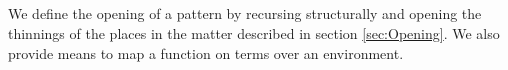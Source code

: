 \begin{code}%
\>[0]\AgdaSpace{}%
\AgdaSpace{}%
\AgdaSymbol{\{}\AgdaSpace{}%
\AgdaSymbol{:}\AgdaSpace{}%
\AgdaSymbol{\}}\AgdaSpace{}%
\AgdaSymbol{:}\AgdaSpace{}%
\AgdaSpace{}%
\AgdaSpace{}%
\AgdaSpace{}%
\AgdaSpace{}%
\<%
\\
\>[0][@{}l@{\AgdaIndent{0}}]%
\>[2]%
\>[9]\AgdaSymbol{:}\AgdaSpace{}%
\AgdaSymbol{\{}\AgdaSpace{}%
\AgdaSymbol{:}\AgdaSpace{}%
\AgdaSymbol{\}}\AgdaSpace{}%
\AgdaSpace{}%
\AgdaSymbol{(}\AgdaSpace{}%
\AgdaSymbol{)}\AgdaSpace{}%
\<%
\\
%
\>[2]%
\>[9]\AgdaSymbol{:}\AgdaSpace{}%
\AgdaSpace{}%
\AgdaSpace{}%
\AgdaSpace{}%
\AgdaSpace{}%
\AgdaSpace{}%
\AgdaSpace{}%
\AgdaSymbol{(}\AgdaSpace{}%
\AgdaSpace{}%
\AgdaSymbol{)}\AgdaSpace{}%
\<%
\\
%
\>[2]%
\>[9]\AgdaSymbol{:}\AgdaSpace{}%
\AgdaSpace{}%
\AgdaSpace{}%
\AgdaSpace{}%
\AgdaSymbol{(}\AgdaSpace{}%
\AgdaSymbol{)}\AgdaSpace{}%
\<%
\\
%
\>[2]%
\>[9]\AgdaSymbol{:}\AgdaSpace{}%
\AgdaSymbol{\{}\AgdaSpace{}%
\AgdaSymbol{:}\AgdaSpace{}%
\AgdaSpace{}%
\AgdaSpace{}%
\AgdaSymbol{\}}\AgdaSpace{}%
\AgdaSpace{}%
\AgdaSpace{}%
\AgdaSpace{}%
\AgdaSpace{}%
\AgdaSymbol{(}\AgdaSpace{}%
\AgdaSymbol{)}\AgdaSpace{}%
\<%
\end{code}

We define the opening of a pattern by recursing structurally and opening
the thinnings of the places in the matter described in section \ref{sec:Opening}.
We also provide means to map a function on terms over an environment.

